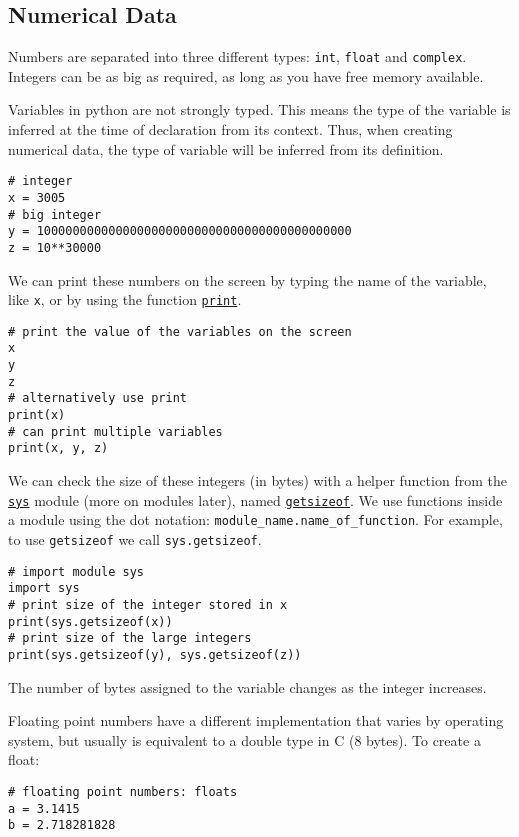\documentclass[12pt, a4paper]{article}
\begin{document}
\subsection{Numerical Data}
\label{sec:org4b95d46}
Numbers are separated into three different types: \texttt{int}, \texttt{float} and \texttt{complex}.
Integers can be as big as required, as long as you have free memory available.

Variables in python are not strongly typed.
This means the type of the variable is inferred at the time of declaration from its context.
Thus, when creating numerical data, the type of variable will be inferred from its definition.

\lstset{language=jupyter-python,label= ,caption= ,captionpos=b,numbers=none}
\begin{lstlisting}
# integer
x = 3005
# big integer
y = 10000000000000000000000000000000000000000000
z = 10**30000
\end{lstlisting}

We can print these numbers on the screen by typing the name of the variable, like \texttt{x}, or by using the function \href{https://docs.python.org/3.6/library/functions.html\#print}{\texttt{print}}.
\lstset{language=jupyter-python,label= ,caption= ,captionpos=b,numbers=none}
\begin{lstlisting}
# print the value of the variables on the screen
x
y
z
# alternatively use print
print(x)
# can print multiple variables
print(x, y, z)
\end{lstlisting}

We can check the size of these integers (in bytes) with a helper function from the \href{https://docs.python.org/3.6/library/sys.html?module-sys\#module-sys}{\texttt{sys}} module (more on modules later), named \href{https://docs.python.org/3.6/library/sys.html?highlight=sys\#sys.getsizeof}{\texttt{getsizeof}}.
We use functions inside a module using the dot notation: \texttt{module\_name.name\_of\_function}.
For example, to use \texttt{getsizeof} we call \texttt{sys.getsizeof}.
\lstset{language=jupyter-python,label= ,caption= ,captionpos=b,numbers=none}
\begin{lstlisting}
# import module sys
import sys
# print size of the integer stored in x
print(sys.getsizeof(x))
# print size of the large integers
print(sys.getsizeof(y), sys.getsizeof(z))
\end{lstlisting}
The number of bytes assigned to the variable changes as the integer increases.

Floating point numbers have a different implementation that varies by operating system, but usually is equivalent to a double type in C (8 bytes).
To create a float:
\lstset{language=jupyter-python,label= ,caption= ,captionpos=b,numbers=none}
\begin{lstlisting}
# floating point numbers: floats
a = 3.1415
b = 2.718281828
\end{lstlisting}
\end{document}

